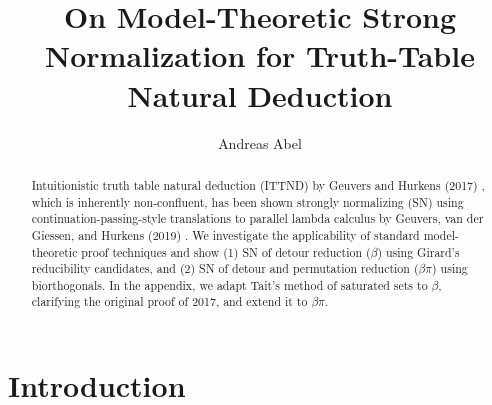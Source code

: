 \documentclass[a4paper,USenglish,cleveref, autoref, thm-restate]{lipics-v2021}
\title{On Model-Theoretic Strong Normalization for Truth-Table Natural Deduction}
\author{Andreas Abel
  }{Department of Computer Science and Engineering,
    Chalmers and Gothenburg University,
    Sweden
  }{andreas.abel@gu.se
  }{https://orcid.org/0000-0003-0420-4492
  }{}
\begin{document}
\maketitle

\begin{abstract}
  Intuitionistic truth table natural deduction (ITTND)
  by Geuvers and Hurkens (2017)%
  , which is
  inherently non-confluent, has been shown strongly normalizing (SN)
  using continuation-passing-style translations to parallel lambda
  calculus by Geuvers, van der Giessen, and Hurkens (2019)%
  .  We investigate the
  applicability of standard model-theoretic proof techniques and show
  (1) SN of detour reduction ($\beta$) using Girard's reducibility
  candidates,
  and (2) SN of detour and permutation
  reduction ($\beta\pi$) using biorthogonals.
  In the appendix, we adapt Tait's method of saturated sets to
  $\beta$, clarifying the original proof of 2017, and extend it to $\beta\pi$.
\end{abstract}

\section{Introduction}
\label{sec:intro}

%
%
%
%


%
%
%
%
%
\end{document}
